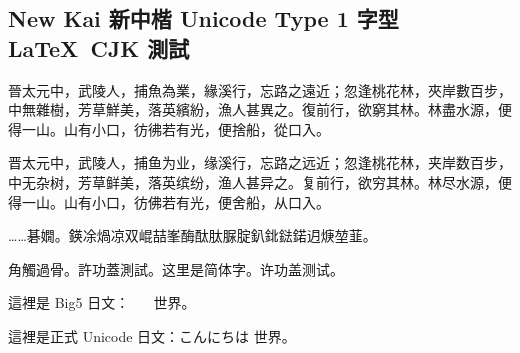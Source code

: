 \documentclass[12pt,a4paper]{article}
\begin{document}
\begin{CJK}{UTF8}{nkai}
\Huge
\section{New Kai 新中楷 Unicode Type 1 字型 \LaTeX\ CJK 測試}

\large
晉太元中，武陵人，捕魚為業，緣溪行，忘路之遠近；忽逢桃花林，夾岸數百步，中無雜樹，芳草鮮美，落英繽紛，漁人甚異之。復前行，欲窮其林。林盡水源，便得一山。山有小口，彷彿若有光，便捨船，從口入。

晋太元中，武陵人，捕鱼为业，缘溪行，忘路之远近；忽逢桃花林，夹岸数百步，中无杂树，芳草鲜美，落英缤纷，渔人甚异之。复前行，欲穷其林。林尽水源，便得一山。山有小口，彷佛若有光，便舍船，从口入。

……碁嫺。鍈凃煱凉双崐喆峯酶酞肽脲腚釟鉳鍅鍩迌焿堃韮。

角觸過骨。許功蓋測試。这里是简体字。许功盖测试。

這裡是 Big5 日文： 世界。

這裡是正式 Unicode 日文：こんにちは 世界。

\newpage
\end{CJK}
\end{document}
